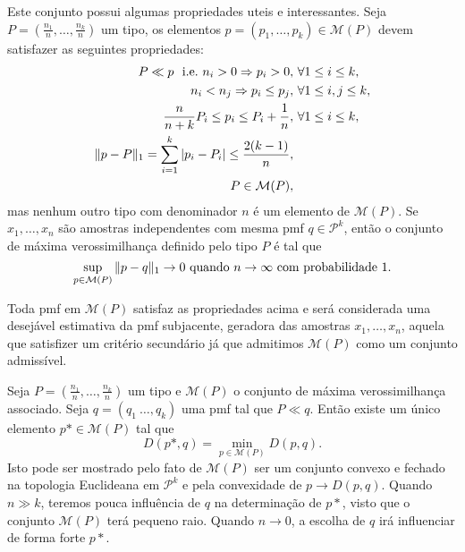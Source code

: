 \begin{questions}
Este conjunto possui algumas propriedades uteis e interessantes.
Seja $P = \left( \frac{n_1}{n}, \ldots, \frac{n_k}{n} \right)$ um tipo,
os elementos $p = (p_1, \ldots, p_k) \in \mathcal{M}(P)$ devem satisfazer as seguintes propriedades:
\begin{eqnarray}
P \ll p \ \ \textmd{i.e.} \ n_i > 0 \Rightarrow p_i > 0 , & \ \forall 1 \leq i \leq k , \nonumber \\
n_i < n_j \Rightarrow p_i \leq p_j , & \ \forall 1 \leq i, j \leq k , \nonumber \\
\frac{n}{n+k} P_i \leq p_i \leq P_i + \frac{1}{n} , & \ \forall 1 \leq i \leq k , \nonumber \\
\Vert p - P \Vert_1 = \sum_{i=1}^k \vert p_i - P_i \vert \leq \frac{2(k-1)}{n} , \nonumber \\
P \in \mathcal{M}(P) ,
\end{eqnarray}
mas nenhum outro tipo com denominador $n$ é um elemento de $\mathcal{M}(P)$.
Se $x_1, \ldots, x_n$ são amostras independentes com mesma pmf $q \in \mathcal{P}^k$, então o conjunto de máxima verossimilhança definido pelo tipo $P$ é tal que
\begin{equation}
\sup_{p \in \mathcal{M}(P)} \Vert p - q \Vert_1 \rightarrow 0 \textmd{ quando } n \rightarrow \infty \textmd{ com probabilidade }1.
\end{equation}

Toda pmf em $\mathcal{M}(P)$ satisfaz as propriedades acima e será considerada uma desejável estimativa da pmf subjacente, geradora das amostras $x_1,\ldots,x_n$, aquela que satisfizer um critério secundário já que admitimos $\mathcal{M}(P)$ como um conjunto admissível.

Seja $P = \left( \frac{n_1}{n}, \ldots, \frac{n_k}{n} \right)$ um tipo e $\mathcal{M}(P)$ o conjunto de máxima verossimilhança associado. Seja $q = (q_1\ \ldots, q_k)$ uma pmf tal que $P \ll q$. Então existe um único elemento $p\ast \in \mathcal{M}(P)$ tal que
\begin{equation}
        D(p\ast, q) = \min_{p \in \mathcal{M}(P)} D(p,q) .
\end{equation}
Isto pode ser mostrado pelo fato de $\mathcal{M}(P)$ ser um conjunto convexo e fechado na topologia Euclideana em $\mathcal{P}^k$ e pela convexidade de $p \rightarrow D(p,q)$. Quando $n \gg k$, teremos pouca influência de $q$ na determinação de $p\ast$, visto que o conjunto $\mathcal{M}(P)$ terá pequeno raio. Quando $n \rightarrow 0$, a escolha de $q$ irá influenciar de forma forte $p\ast$.





\end{questions}
